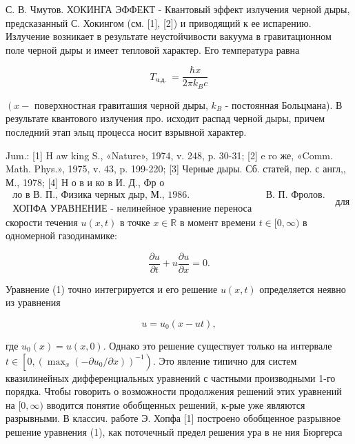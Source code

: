 \documentclass[10pt]{article}
\begin{document}
С. В. Чмутов. ХОКИНГА ЭФФЕКТ - Квантовый эффект излучения черной дыры, предсказанный С. Хокингом (см. [1], [2]) и приводящий к ее испарению. Излучение возникает в результате неустойчивости вакуума в гравитационном поле черной дыры и имеет тепловой характер. Его температура равна



\[

T_{\text {ч.д. }}=\frac{\hbar x}{2 \pi k_{B} c}

\]



$\left(x-\right.$ поверхностная гравиташия черной дыры, $k_{B}$ - постоянная Больцмана). В результате квантового излучения про. исходит распад черной дыры, причем последний этап элыц процесса носит взрывной характер.



Jum.: [1] H aw king S., «Nature», 1974, v. 248, p. 30-31; [2] e ro же, «Comm. Math. Phys.», 1975, v. 43, p. 199-220; [3] Черные дыры. Сб. статей, пер. с англ,, М., 1978; [4] Н о в и ко в И. Д., Фр о $\begin{array}{ll}\text { ло в В. П., Физика черных дыр, М., 1986. } & \text { В. П. Фролов. } \\ \text { ХОПФА УРАВНЕНИЕ - нелинейное уравнение переноса }\end{array}$ для скорости течения $u(x, t)$ в точке $x \in \mathbb{R}$ в момент времени $t \in[0, \infty)$ в одномерной газодинамике:



\[

\frac{\partial u}{\partial t}+u \frac{\partial u}{\partial x}=0 .

\]



Уравнение (1) точно интегрируется и его решение $u(x, t)$ определяется неявно из уравнения



\[

u=u_{0}(x-u t),

\]



где $u_{0}(x)=u(x, 0)$. Однако это решение существует только на интервале $t \in\left[0,\left(\max _{x}\left(-\partial u_{0} / \partial x\right)\right)^{-1}\right)$. Это явление типично для систем квазилинейных дифференциальных уравнений с частными производными 1-го порядка. Чтобы говорить о возможности продолжения решений этих уравнений на $[0, \infty)$ вводится понятие обобщенных решений, к-рые уже являются разрывными. В классич. работе Э. Хопфа [1] построено обобщенное разрывное решение уравнения (1), как поточечный предел решения ура в не ния Бюргерса
\end{document}
